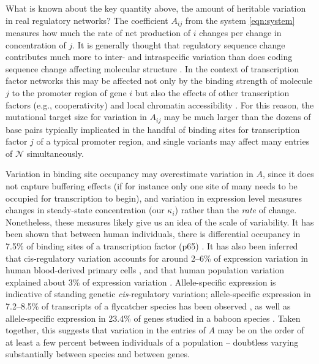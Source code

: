 \documentclass{article}
\newcommand{\1}{\mathbbm{1}}
\newcommand{\allS}{\mathcal{N}}
\begin{document}
What is known about the key quantity above, the amount of heritable variation in real regulatory networks?
The coefficient $A_{ij}$ from the system \eqref{eqn:system} measures how much the rate of net production of $i$ changes
per change in concentration of $j$.
It is generally thought that regulatory sequence change contributes much more to inter- and intraspecific variation
than does coding sequence change affecting molecular structure \citep{schmidt2010fivevertebrate}.
In the context of transcription factor networks this may be affected 
not only by the binding strength of molecule $j$ to the promoter region of gene $i$
but also the effects of other transcription factors (e.g., cooperativity)
and local chromatin accessibility \citep{stefflova2013cooperativity}.
For this reason, 
the mutational target size for variation in $A_{ij}$ may be much larger than the dozens of base pairs
typically implicated in the handful of binding sites for transcription factor $j$ of a typical promoter region,
and single variants may affect many entries of $\allS$ simultaneously.

Variation in binding site occupancy may overestimate variation in $A$,
since it does not capture buffering effects (if for instance only one site of many needs to be occupied for transcription to begin),
and variation in expression level measures changes in steady-state concentration (our $\kappa_i$) rather than the \emph{rate} of change.
Nonetheless, these measures likely give us an idea of the scale of variability.
It has been shown that between human individuals, there is differential occupancy in 7.5\%
of binding sites of a transcription factor (p65) \citep{kasowski2010variation}.
It has also been inferred that cis-regulatory variation
accounts for around 2--6\% of expression variation in human blood-derived primary cells \citep{verlaan2009targeted}, and
that human population variation 
explained about 3\% of expression variation \citep{lappalainen2013transcriptome}.
Allele-specific expression is indicative of standing genetic \emph{cis}-regulatory variation;
allele-specific expression in 7.2--8.5\% of transcripts of a flycatcher species has been observed \citep{wang2017bayesian}, as well as
allele-specific expression in 23.4\% of genes studied in a baboon species \citep{tung2015genetic}. 
Taken together, this suggests that variation in the entries of $A$
may be on the order of at least a few percent between individuals of a population --
doubtless varying substantially between species and between genes.
\end{document}
